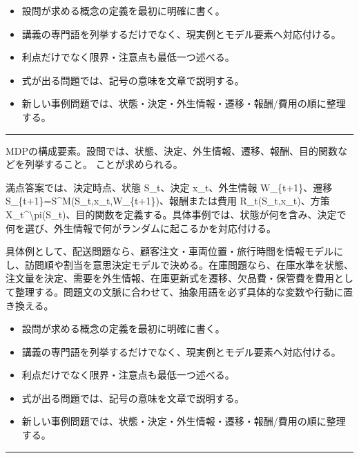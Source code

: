 \begin{itemize}
\item 設問が求める概念の定義を最初に明確に書く。
\item 講義の専門語を列挙するだけでなく、現実例とモデル要素へ対応付ける。
\item 利点だけでなく限界・注意点も最低一つ述べる。
\item 式が出る問題では、記号の意味を文章で説明する。
\item 新しい事例問題では、状態・決定・外生情報・遷移・報酬/費用の順に整理する。
\end{itemize}
\vspace{2mm}\hrule\vspace{2mm}
MDPの構成要素。設問では、状態、決定、外生情報、遷移、報酬、目的関数などを列挙すること。 ことが求められる。\par
{}
満点答案では、決定時点、状態 S\_t、決定 x\_t、外生情報 W\_\{t+1\}、遷移 S\_\{t+1\}=S\textasciicircum{}M(S\_t,x\_t,W\_\{t+1\})、報酬または費用 R\_t(S\_t,x\_t)、方策 X\_t\textasciicircum{}\textbackslash{}pi(S\_t)、目的関数を定義する。具体事例では、状態が何を含み、決定で何を選び、外生情報で何がランダムに起こるかを対応付ける。\par
{}
具体例として、配送問題なら、顧客注文・車両位置・旅行時間を情報モデルにし、訪問順や割当を意思決定モデルで決める。在庫問題なら、在庫水準を状態、注文量を決定、需要を外生情報、在庫更新式を遷移、欠品費・保管費を費用として整理する。問題文の文脈に合わせて、抽象用語を必ず具体的な変数や行動に置き換える。\par
{}
\begin{itemize}
\item 設問が求める概念の定義を最初に明確に書く。
\item 講義の専門語を列挙するだけでなく、現実例とモデル要素へ対応付ける。
\item 利点だけでなく限界・注意点も最低一つ述べる。
\item 式が出る問題では、記号の意味を文章で説明する。
\item 新しい事例問題では、状態・決定・外生情報・遷移・報酬/費用の順に整理する。
\end{itemize}
\vspace{2mm}\hrule\vspace{2mm}